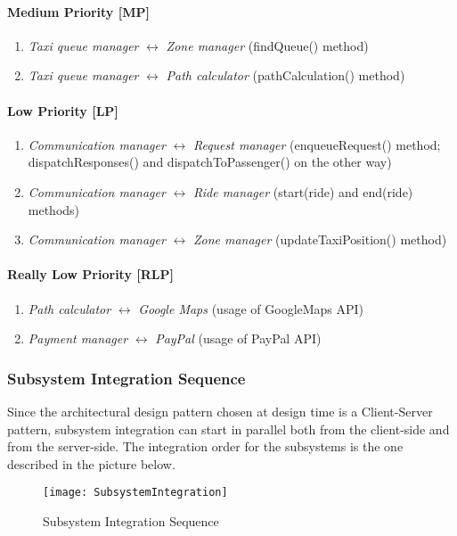     \paragraph{Medium Priority [MP]}
    \begin{enumerate}
        \item \textit{Taxi queue manager} $ \longleftrightarrow $ \textit{Zone manager} (findQueue() method)
        \item \textit{Taxi queue manager} $ \longleftrightarrow $ \textit{Path calculator} (pathCalculation() method)
    \end{enumerate}

    \paragraph{Low Priority [LP]}
    \begin{enumerate}
        \item \textit{Communication manager} $ \longleftrightarrow $ \textit{Request manager} (enqueueRequest() method; dispatchResponses() and dispatchToPassenger() on the other way)
        \item \textit{Communication manager} $ \longleftrightarrow $ \textit{Ride manager} (start(ride) and end(ride) methods)
        \item \textit{Communication manager} $ \longleftrightarrow $ \textit{Zone manager} (updateTaxiPosition() method)
    \end{enumerate}
    
    \paragraph{Really Low Priority [RLP]}
    \begin{enumerate}
        \item \textit{Path calculator} $ \longleftrightarrow $ \textit{Google Maps} (usage of GoogleMaps API)
        \item \textit{Payment manager} $ \longleftrightarrow $ \textit{PayPal} (usage of PayPal API)
    \end{enumerate}
    
\newpage
    \subsubsection{Subsystem Integration Sequence}
    Since the architectural design pattern chosen at design time is a Client-Server pattern, subsystem integration can start in parallel both from the client-side and from the server-side. The integration order for the subsystems is the one described in the picture below.
    
    \begin{figure}[h!]
        \centering
        \texttt{[image: SubsystemIntegration]}
        \caption{Subsystem Integration Sequence}
        \label{fig:SubsystemIntegration}
    \end{figure}